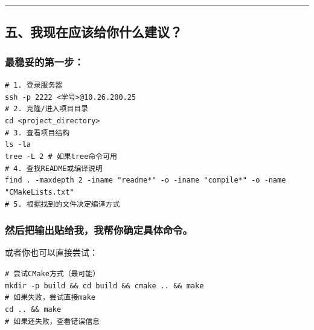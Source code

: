 \documentclass[11pt, a4paper]{article}
\begin{document}
\begin{aibox}
\begin{center}\rule{\textwidth}{0.4pt}\end{center}

\subsection*{五、我现在应该给你什么建议？}

\subsubsection*{最稳妥的第一步：}
\begin{tcolorbox}[colback=white,colframe=gray!50!white,boxrule=0.5pt,arc=2pt,left=5pt,right=5pt,top=5pt,bottom=5pt]
\texttt{\# 1. 登录服务器}\\
\texttt{ssh -p 2222 \textless 学号\textgreater @10.26.200.25}\\[0.5em]
\texttt{\# 2. 克隆/进入项目目录}\\
\texttt{cd \textless project\_directory\textgreater }\\[0.5em]
\texttt{\# 3. 查看项目结构}\\
\texttt{ls -la}\\
\texttt{tree -L 2  \# 如果tree命令可用}\\[0.5em]
\texttt{\# 4. 查找README或编译说明}\\
\texttt{find . -maxdepth 2 -iname "readme*" -o -iname "compile*" -o -name "CMakeLists.txt"}\\[0.5em]
\texttt{\# 5. 根据找到的文件决定编译方式}
\end{tcolorbox}

\subsubsection*{然后把输出贴给我，我帮你确定具体命令。}

或者你也可以直接尝试：
\begin{tcolorbox}[colback=white,colframe=gray!50!white,boxrule=0.5pt,arc=2pt,left=5pt,right=5pt,top=5pt,bottom=5pt]
\texttt{\# 尝试CMake方式（最可能）}\\
\texttt{mkdir -p build \&\& cd build \&\& cmake .. \&\& make}\\[0.5em]
\texttt{\# 如果失败，尝试直接make}\\
\texttt{cd .. \&\& make}\\[0.5em]
\texttt{\# 如果还失败，查看错误信息}
\end{tcolorbox}


\end{aibox}
\end{document}
